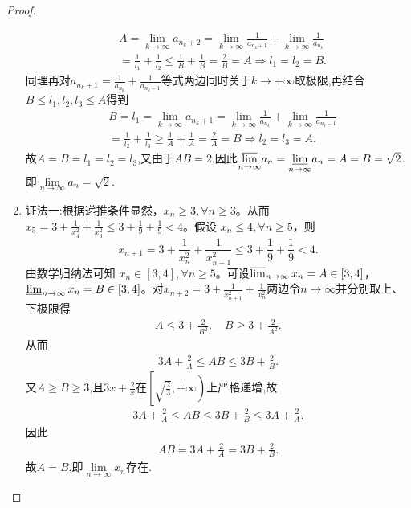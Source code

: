 \documentclass[../../main.tex]{subfiles}
\begin{document}
\begin{proof}
\begin{enumerate}
\begin{align*}
&A=\lim_{k\rightarrow \infty} a_{n_k+2}=\lim_{k\rightarrow \infty} \frac{1}{a_{n_k+1}}+\lim_{k\rightarrow \infty} \frac{1}{a_{n_k}}
\\
&=\frac{1}{l_1}+\frac{1}{l_2}\leqslant \frac{1}{B}+\frac{1}{B}=\frac{2}{B}=A\Rightarrow l_1=l_2=B.
\end{align*}
同理再对$a_{n_k+1}=\frac{1}{a_{n_k}}+\frac{1}{a_{n_k-1}}$等式两边同时关于$k\to+\infty$取极限,再结合$B\leqslant  l_1,l_2,l_3\leqslant  A$得到
\begin{align*}
&B=l_1=\lim_{k\rightarrow \infty} a_{n_k+1}=\lim_{k\rightarrow \infty} \frac{1}{a_{n_k}}+\lim_{k\rightarrow \infty} \frac{1}{a_{n_k-1}}
\\
&=\frac{1}{l_2}+\frac{1}{l_3}\geqslant \frac{1}{A}+\frac{1}{A}=\frac{2}{A}=B\Rightarrow l_2=l_3=A.
\end{align*}
故$A=B=l_1=l_2=l_3$,又由于$AB=2$,因此$\underset{n\rightarrow \infty}{{\varlimsup }}a_n=\underset{n\rightarrow \infty}{{\varliminf }}a_n=A=B=\sqrt{2}$.即$\underset{n\rightarrow \infty}{\lim}a_n=\sqrt{2}$.

\item {\color{blue}证法一:}根据递推条件显然，\(x_n\geqslant 3,\forall n\geqslant 3\)。从而 \(x_5 = 3+\frac{1}{x_{4}^{2}}+\frac{1}{x_{3}^{2}}\leqslant 3+\frac{1}{9}+\frac{1}{9}<4\)。假设 \(x_n\leqslant 4,\forall n\geqslant 5\)，则
\[
x_{n + 1}=3+\frac{1}{x_{n}^{2}}+\frac{1}{x_{n - 1}^{2}}\leqslant 3+\frac{1}{9}+\frac{1}{9}<4.
\]
由数学归纳法可知 \(x_n\in [3,4],\forall n\geqslant 5\)。可设$\varlimsup_{n\rightarrow \infty}x_n=A\in [3,4]$，$\varliminf_{n\rightarrow \infty}x_n=B\in [3,4]$。对$x_{n+2}=3+\frac{1}{x_{n+1}^{2}}+\frac{1}{x_{n}^{2}}$两边令$n\rightarrow \infty$并分别取上、下极限得
\begin{align*}
A\leqslant 3+\frac{2}{B^2},\quad B\geqslant 3+\frac{2}{A^2}.
\end{align*}
从而
\begin{align*}
3A+\frac{2}{A}\leqslant AB\leqslant 3B+\frac{2}{B}.
\end{align*}
又$A\geqslant B\geqslant 3$,且$3x+\frac{2}{x}$在$\left[ \sqrt{\frac{2}{3}},+\infty \right)$上严格递增,故
\begin{align*}
3A+\frac{2}{A}\leqslant AB\leqslant 3B+\frac{2}{B}\leqslant 3A+\frac{2}{A}.
\end{align*}
因此
\begin{align*}
AB=3A+\frac{2}{A}=3B+\frac{2}{B}.
\end{align*}
故$A=B$,即$\underset{n\rightarrow \infty}{\lim}x_n$存在.


\end{enumerate}
\end{proof}
\end{document}
